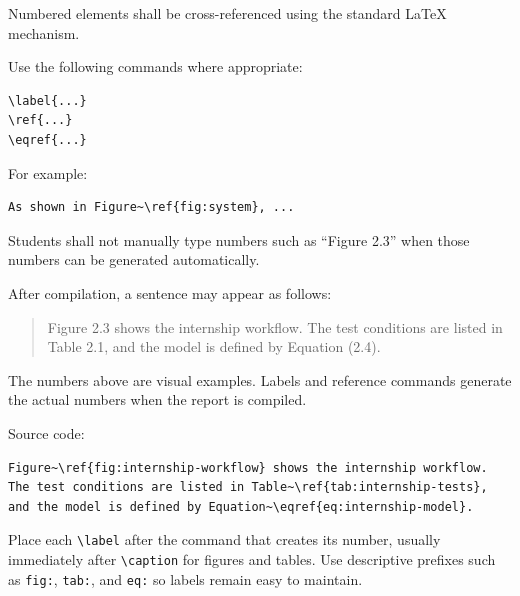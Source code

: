 {\vspace{0.3cm}


\noindent
{}

\vspace{0.15cm}

Numbered elements shall be cross-referenced using the standard \LaTeX{}
mechanism.

Use the following commands where appropriate:

\begin{verbatim}
\label{...}
\ref{...}
\eqref{...}
\end{verbatim}

For example:

\begin{verbatim}
As shown in Figure~\ref{fig:system}, ...
\end{verbatim}

Students shall not manually type numbers such as ``Figure 2.3'' when
those numbers can be generated automatically.



After compilation, a sentence may appear as follows:

\begin{quote}
Figure 2.3 shows the internship workflow. The test conditions are
listed in Table 2.1, and the model is defined by Equation (2.4).
\end{quote}

The numbers above are visual examples. Labels and reference commands
generate the actual numbers when the report is compiled.

Source code:

\begin{verbatim}
Figure~\ref{fig:internship-workflow} shows the internship workflow.
The test conditions are listed in Table~\ref{tab:internship-tests},
and the model is defined by Equation~\eqref{eq:internship-model}.
\end{verbatim}

Place each \verb|\label| after the command that creates its number,
usually immediately after \verb|\caption| for figures and tables.
Use descriptive prefixes such as \verb|fig:|, \verb|tab:|, and
\verb|eq:| so labels remain easy to maintain.


}
